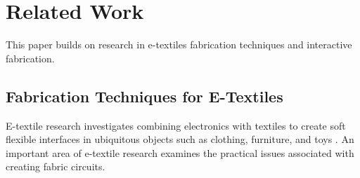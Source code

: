 \section{Related Work}
This paper builds on research in e-textiles fabrication techniques and interactive fabrication.

\subsection{Fabrication Techniques for E-Textiles}
E-textile research investigates combining electronics with textiles to create soft flexible interfaces in ubiquitous objects such as clothing, furniture, and toys \cite{Buechley2009}. An important area of e-textile research examines the practical issues associated with creating fabric circuits.





